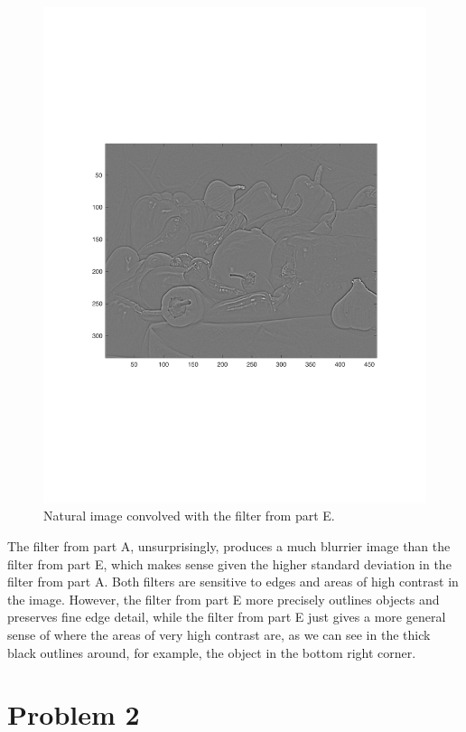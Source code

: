 \documentclass[]{article}
\begin{document}
\begin{figure}[H]
    \centering
    \includegraphics{problem1FfilterE.pdf}
    \caption{Natural image convolved with the filter from part E.}
    \label{fig:my_label}
\end{figure}

The filter from part A, unsurprisingly, produces a much blurrier image than the filter from part E, which makes sense given the higher standard deviation in the filter from part A. Both filters are sensitive to edges and areas of high contrast in the image. However, the filter from part E more precisely outlines objects and preserves fine edge detail, while the filter from part E just gives a more general sense of where the areas of very high contrast are, as we can see in the thick black outlines around, for example, the object in the bottom right corner.

\section*{Problem 2}
\end{document}
